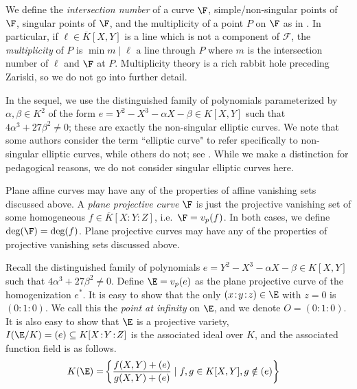 \documentclass[11pt,letterpaper]{article}
\theoremstyle{definition}
\newcommand{\6}{\mathbf}
\newcommand{\7}{\mathcal}
\begin{document}
We define the \textit{intersection number} of a curve $\F$, simple/non-singular points of $\F$, singular points of $\F$, and the multiplicity of a point $P$ on $\F$ as in \cite{hirschfeld2008algebraic}. In particular, if $\ell \in \overline{K}[X,Y]$ is a line which is not a component of $\mathcal{F}$, the \textit{multiplicity} of $P$ is $\min{m \mid \ell\text{ a line through }P}$ where $m$ is the intersection number of $\ell$ and $\F$ at $P$. Multiplicity theory is a rich rabbit hole  preceding Zariski, so we do not go into further detail. 

In the sequel, we use the distinguished family of polynomials parameterized by $\alpha, \beta \in K^2$ of the form $e = Y^2 - X^3 - \alpha X - \beta \in K[X,Y]$ such that $4\alpha^3 + 27\beta^2 \neq 0$; these are exactly the non-singular elliptic curves. We note that some authors consider the term ``elliptic curve" to refer specifically to non-singular elliptic curves, while others do not; see \cite{Silverman,DummitNotes}. While we make a distinction for pedagogical reasons, we do not consider singular elliptic curves here.

Plane affine curves may have any of the properties of affine vanishing sets discussed above. 
A \textit{plane projective curve} $\F$ is just the projective vanishing set of some homogeneous $f \in \overline{K}[X\!:\!Y\!:\!Z]$, i.e.\ $\F = v_p(f)$. In both cases, we define $\text{deg}(\F) = \text{deg}(f)$. Plane projective curves may have any of the properties of projective vanishing sets discussed above. 

Recall the distinguished family of polynomials $e = Y^2 - X^3 - \alpha X - \beta \in K[X,Y]$ such that $4\alpha^3 + 27\beta^2 \neq 0$. Define $\E=v_p(e)$ as the plane projective curve of the homogenization $e^*$. It is easy to show that the only $(x\!:\!y\!:\!z) \in \E$ with $z=0$ is $(0\!:\!1\!:\!0)$.  We call this the \textit{point at infinity} on $\E$, and we denote $O = (0\!:\!1\!:\!0)$. It is also easy to show that $\E$ is a projective variety, $I(\E/K) = (e) \subseteq K[X\!:\!Y\!:\!Z]$ is the associated ideal over $K$, and the associated function field is as follows.
\begin{align}
K(\E) =& \left\{\frac{f(X,Y) + (e)}{g(X,Y) + (e)} \mid f, g \in K[X,Y], g \notin (e) \right\}
\end{align}
\end{document}
